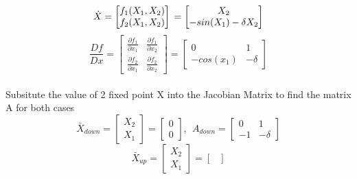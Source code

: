 \begin{itemize}
    \begin{equation}
      \dot{X} =  
      \begin{bmatrix} 
        f_{1}(X_{1}, X_{2})\\ f_{2}(X_{1}, X_{2}) 
      \end{bmatrix}\\
      =
      \begin{bmatrix} 
        X_{2}\\ -sin(X_{1}) -\delta X_{2} 
      \end{bmatrix} 
    \end{equation}
    \begin{equation}
      \frac{Df}{Dx} =
            \begin{bmatrix}
              \frac{\partial f_{1}}{\partial x_{1}}  & \frac{\partial f_{1}}{\partial x_{2}} \\ 
              \frac{\partial f_{2}}{\partial x_{1}}  & \frac{\partial f_{2}}{\partial x_{2}} 
            \end{bmatrix}
            =
            \begin{bmatrix}
               0 &  1 \\ 
              -cos(x_{1}) & -\delta
            \end{bmatrix}  
    \end{equation}  
  \\Subsitute the value of 2 fixed point X into the Jacobian Matrix to find the matrix A for both cases
    \begin{equation}
      \bar{X}_{down} =
      \begin{bmatrix} 
        X_{2}\\ 
        X_{1}
      \end{bmatrix} 
      =  
      \begin{bmatrix} 
        0\\ 0  
      \end{bmatrix}
      ,~~A_{down} =  
      \begin{bmatrix}
        0 &  1 \\ 
       -1 & -\delta
     \end{bmatrix}  
    \end{equation}
    \begin{equation}
      \bar{X}_{up} =
      \begin{bmatrix} 
        X_{2}\\ 
        X_{1}
      \end{bmatrix} 
      =  
      \begin{bmatrix} 

\end{bmatrix}
\end{equation}
\end{itemize}
